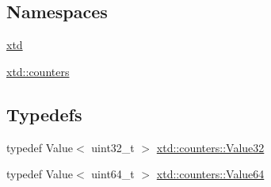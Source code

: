 \subsection*{Namespaces}
\begin{DoxyCompactItemize}
\item 
 \hyperlink{namespacextd}{xtd}
\item 
 \hyperlink{namespacextd_1_1counters}{xtd\+::counters}
\end{DoxyCompactItemize}
\subsection*{Typedefs}
\begin{DoxyCompactItemize}
\item 
typedef Value$<$ uint32\+\_\+t $>$ \hyperlink{namespacextd_1_1counters_ad10dfbcb762ad7dfc7199ab5a268bc6e}{xtd\+::counters\+::\+Value32}
\item 
typedef Value$<$ uint64\+\_\+t $>$ \hyperlink{namespacextd_1_1counters_a20cdfbbbf5aa96abb1c5d461497d1769}{xtd\+::counters\+::\+Value64}
\end{DoxyCompactItemize}
